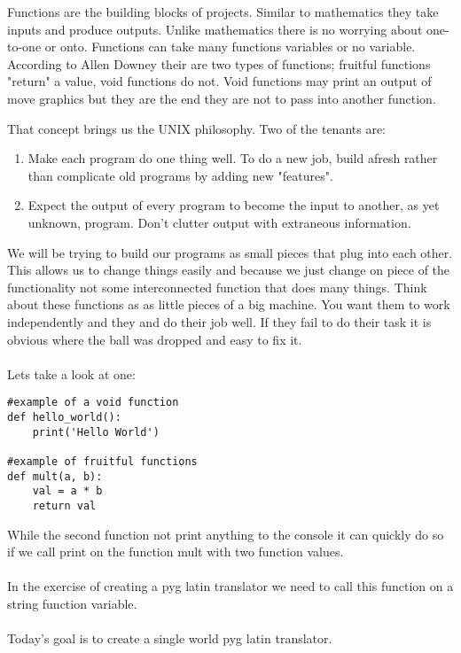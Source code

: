 \documentclass[../main.tex]{subfiles}
\begin{document}
Functions are the building blocks of projects. Similar to mathematics they take inputs and produce outputs. Unlike mathematics there is no worrying about one-to-one or onto. Functions can take many functions variables or no variable. According to Allen Downey their are two types of functions; fruitful functions "return" a value, void functions do not. Void functions may print an output of move graphics but they are the end they are not to pass into another function.

That concept brings us the UNIX philosophy. Two of the tenants are:
\begin{enumerate}
    \item Make each program do one thing well. To do a new job, build afresh rather than complicate old programs by adding new "features".
    \item Expect the output of every program to become the input to another, as yet unknown, program. Don't clutter output with extraneous information.
\end{enumerate}

We will be trying to build our programs as small pieces that plug into each other. This allows us to change things easily and because we just change on piece of the functionality not some interconnected function that does many things. Think about these functions as as little pieces of a big machine. You want them to work independently and they and do their job well. If they fail to do their task it is obvious where the ball was dropped and easy to fix it.\\
\\
Lets take a look at one:
\begin{lstlisting}
#example of a void function
def hello_world():
    print('Hello World')

#example of fruitful functions
def mult(a, b):
    val = a * b
    return val
\end{lstlisting}
While the second function not print anything to the console it can quickly do so if we call print on the function mult with two function values.\\
\\
In the exercise of creating a pyg latin translator we need to call this function on a string function variable.\\
\\
Today's goal is to create a single world pyg latin translator.

\newpage
\end{document}
